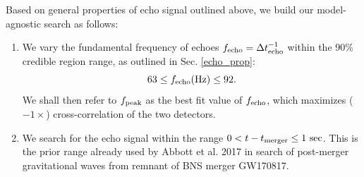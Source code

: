 \documentclass[a4paper,11pt]{article}
\begin{document}
Based on general properties of echo signal outlined above, we build our model-agnostic search as follows:
\begin{enumerate}
\item We vary the fundamental frequency of echoes  $f_{\rm echo}= \Delta t_{\rm echo}^{-1}$ within the 90\% credible region range, as outlined in Sec. \ref{echo_prop}:
$$
63 \leq f_{{\rm echo} }({\rm Hz}) \leq 92.
$$
We shall then refer to $f_{\rm{peak}}$ as the best fit value of $f_{\rm echo}$, which maximizes ($-1\times$) cross-correlation of the two detectors. 




\item We search for the echo signal within the range $0 <t-t_{\rm{merger}} \leq 1~ \rm{sec}$. This is the prior range already used by Abbott et al. 2017 \cite{Abbott:2017dke} in search of post-merger gravitational waves from remnant of BNS merger GW170817.


\end{enumerate}
\end{document}
